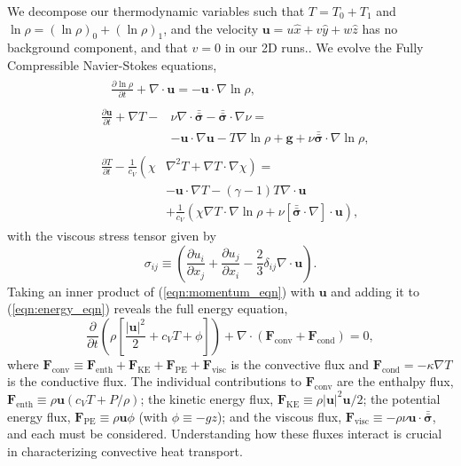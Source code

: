 \documentclass[aps, prl, twocolumn, nofootinbib, groupedaddress, amsfonts, amssymb, amsmath]{revtex4-1}
\newcommand{\Div}[1]{\ensuremath{\nabla\cdot\left( #1\right)}}
\newcommand{\grad}{\ensuremath{\nabla}}
\newcommand{\lilstressT}{\ensuremath{\bm{\bar{\bar{\sigma}}}}}
\begin{document}
We decompose our thermodynamic variables such that $T = T_0 + T_1$ and
$\ln\rho = (\ln\rho)_0 + (\ln\rho)_1$, 
and the velocity $\bm{u} = u\hat{x} + v\hat{y} +  w\hat{z}$ 
has no background component, and that $v = 0$ in our 2D runs..    
We evolve the Fully Compressible Navier-Stokes equations,
\begin{align}
&\begin{aligned}
&\frac{\partial \ln\rho}{\partial t} + \grad\cdot\bm{u} 
    = -\bm{u}\cdot\grad\ln\rho,
	\label{eqn:continuity_eqn}
\end{aligned}\\
&\begin{aligned}
\frac{\partial\bm{u}}{\partial t} + \grad T - 
&\nu\grad\cdot\lilstressT - \lilstressT\cdot\grad\nu = \\
&-\bm{u}\cdot\grad\bm{u} - T\grad\ln\rho + \bm{g} + 
\nu\lilstressT\cdot\grad\ln\rho,
\label{eqn:momentum_eqn}
\end{aligned}\\
&\begin{aligned}
\frac{\partial T}{\partial t} -\frac{1}{c_V}\left(\right.\chi&\left.
    \grad^2 T + \grad T\cdot\grad\chi\right) = \\
	&-\bm{u}\cdot\grad T - (\gamma-1)T\grad\cdot{\bm{u}} \\
	&+ \frac{1}{c_V}\left(\chi\grad T \cdot\grad\ln\rho +
	\nu\left[\lilstressT\cdot\nabla\right]\cdot\bm{u}\right), 
	\label{eqn:energy_eqn}
\end{aligned}
\end{align}
with the viscous stress tensor given by
\begin{equation}
\sigma_{ij} \equiv \left(\frac{\partial u_i}{\partial x_j} + 
\frac{\partial u_j}{\partial x_i} - \frac{2}{3}\delta_{ij}\grad\cdot\bm{u}\right).
	\label{eqn:stress_tensor}
\end{equation}
Taking an inner product of
(\ref{eqn:momentum_eqn}) with $\bm{u}$ and adding it to 
(\ref{eqn:energy_eqn}) reveals the full energy equation,
\begin{equation}
\frac{\partial}{\partial t}\left(\rho\left[\frac{|\bm{u}|^2}{2} + c_V T + \phi\right]\right) +
\Div{\bm{F}_{\text{conv}} + \bm{F}_{\text{cond}}} = 0,
	\label{eqn:energy_eqn_full}
\end{equation}
where
$
\bm{F}_{\text{conv}} \equiv \bm{F}_{\text{enth}} + \bm{F}_{\text{KE}} + \bm{F}_{\text{PE}} + \bm{F}_{\text{visc}}
$
is the convective flux and $\bm{F}_{\text{cond}} = -\kappa \grad T$
is the conductive flux.
The individual contributions to $\bm{F}_{\text{conv}}$ are the enthalpy flux, 
$\bm{F}_{\text{enth}} \equiv \rho\bm{u}(c_V T + P/\rho)$;
the kinetic energy flux, 
$\bm{F}_{\text{KE}} \equiv \rho|\bm{u}|^2\bm{u}/2$;
the potential energy flux,
$\bm{F}_{\text{PE}} \equiv \rho\bm{u}\phi$ (with $\phi \equiv -gz$);
and the viscous flux, 
$\bm{F}_{\text{visc}} \equiv -\rho\nu\bm{u}\cdot\lilstressT$, and each 
must be considered. 
Understanding how these fluxes interact  
is crucial in characterizing convective heat transport.
\end{document}
